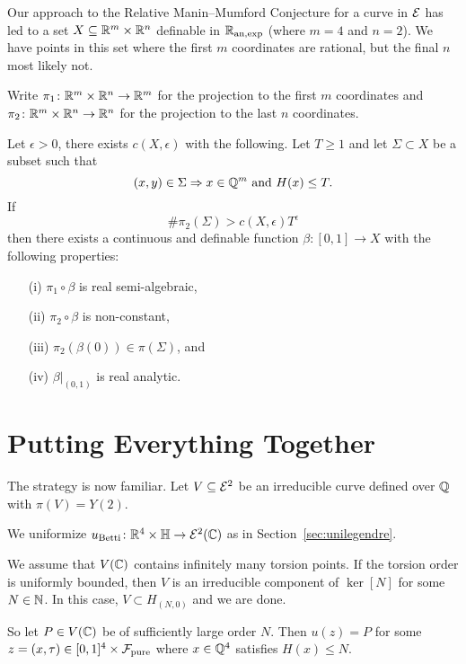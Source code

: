 Our approach to the Relative Manin--Mumford Conjecture for a curve in
${\mathcal E}$ has led to a set $X\subseteq {\mathbb{R}}^m\times{\mathbb{R}}^n$
definable in ${{\mathbb{R}}_{\mathrm{an,exp}}}$
(where $m=4$ and $n=2$). We have points in this set where the
first $m$ coordinates are rational, but the final $n$ most likely not.

Write $\pi_1\colon{\mathbb{R}}^m\times{\mathbb{R}}^n\rightarrow{\mathbb{R}}^m$ for the projection
to the first $m$ coordinates and
$\pi_2\colon{\mathbb{R}}^m\times{\mathbb{R}}^n\rightarrow{\mathbb{R}}^n$ for the projection to
the last $n$ coordinates. 

\begin{theorem}
  \label{thm:semirationalpw}
  Let $\epsilon>0$, there exists $c(X,\epsilon)$ with the following.
  Let $T\ge 1$ and let $\Sigma\subset X$ be a subset such that
  $$(x,y)\in
  \Sigma\Rightarrow x\in {\mathbb{Q}}^m \text{ and }H(x)\le T.$$
  If
  $$\#\pi_2(\Sigma)>c(X,\epsilon) T^\epsilon$$
  then there exists a continuous and definable function $\beta\colon
  [0,1]\rightarrow X$ with the following properties:
  \begin{enumerate}
  \item [(i)] $\pi_1\circ\beta$ is real semi-algebraic,
  \item[(ii)] $\pi_2\circ\beta$ is non-constant,
  \item[(iii)] $\pi_2(\beta(0))\in \pi(\Sigma)$, and
  \item[(iv)] $\beta|_{(0,1)}$ is real analytic. 
  \end{enumerate}
\end{theorem}

\section{Putting Everything Together}

The strategy is now familiar.
Let $V\subseteq{\mathcal E}^2$ be an irreducible curve defined over ${\mathbb{Q}}$ with
$\pi(V)=Y(2)$.

We uniformize $u_{\mathrm{Betti}}\colon {\mathbb{R}}^4\times{\mathbb{H}} \rightarrow
{\mathcal E}^{2}({\mathbb{C}})$ as in Section~\ref{sec:unilegendre}.


We assume that $V({\mathbb{C}})$ contains infinitely many torsion points.
If the torsion order is uniformly bounded, then $V$ is an irreducible
component of $\ker[N]$ for some $N\in{\mathbb{N}}$.
In this case, $V\subset H_{(N,0)}$ and we are done. 

So let $P\in V({\mathbb{C}})$ be of sufficiently large order $N$. Then $u(z) = P$
for some $z=(x,\tau)\in [0,1]^4\times{\mathcal F}_{\mathrm{pure}}$
where $x\in{\mathbb{Q}}^4$ satisfies $H(x)\le N$.

